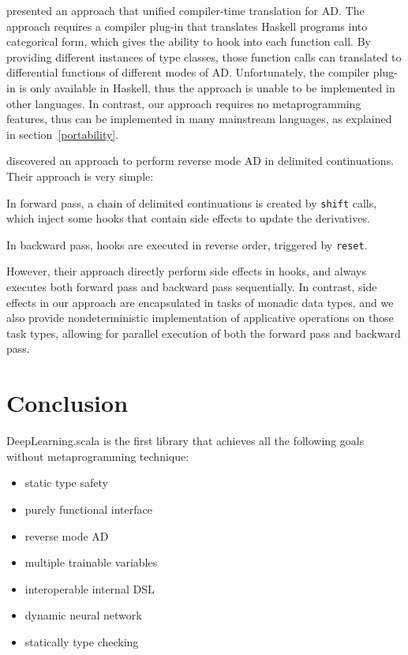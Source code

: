 \cite{elliott2018simple} presented an approach that unified compiler-time translation for AD. The approach requires a compiler plug-in that translates Haskell programs into categorical form, which gives the ability to hook into each function call. By providing different instances of type classes, those function calls can translated to differential functions of different modes of AD. Unfortunately, the compiler plug-in is only available in Haskell, thus the approach is unable to be implemented in other languages. In contrast, our approach requires no metaprogramming features, thus can be implemented in many mainstream languages, as explained in section~\ref{portability}.

\cite{wangbackpropagation} discovered an approach to perform reverse mode AD in delimited continuations. Their approach is very simple: 
\begin{enumerate*}
  \item In forward pass, a chain of delimited continuations is created by \lstinline{shift} calls, which inject some hooks that contain side effects to update the derivatives.
  \item In backward pass, hooks are executed in reverse order, triggered by \lstinline{reset}.
\end{enumerate*}
However, their approach directly perform side effects in hooks, and always executes both forward pass and backward pass sequentially. In contrast, side effects in our approach are encapsulated in tasks of monadic data types, and we also provide nondeterministic implementation of applicative operations on those task types, allowing for parallel execution of both the forward pass and backward pass.

\section{Conclusion}

DeepLearning.scala is the first library that achieves all the following goals without metaprogramming technique:

\begin{itemize}
  \item static type safety
  \item purely functional interface
  \item reverse mode AD
  \item multiple \glspl{trainable variable}
  \item interoperable internal DSL
  \item dynamic neural network
  \item statically type checking
\end{itemize}

